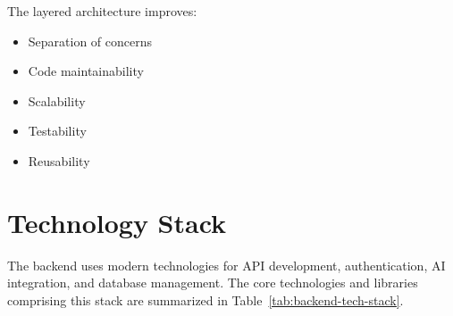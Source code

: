 The layered architecture improves:

\begin{itemize}
    \item Separation of concerns
    \item Code maintainability
    \item Scalability
    \item Testability
    \item Reusability
\end{itemize}

\section{Technology Stack}
\label{sec:backend-tech-stack}

The backend uses modern technologies for API development, authentication, AI integration, and database management. The core technologies and libraries comprising this stack are summarized in Table~\ref{tab:backend-tech-stack}.

